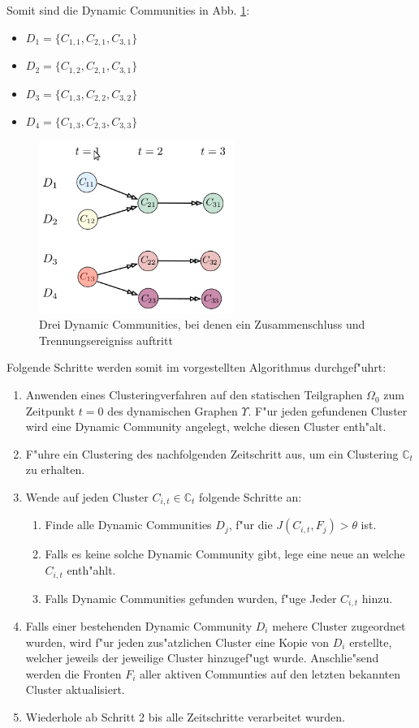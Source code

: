 \documentclass[journal]{vgtc}
\begin{document}
    Somit sind die Dynamic Communities in Abb. \ref{fig:dynamic2}:
    \begin{itemize}
      \item $D_1 =\{C_{1,1}, C_{2,1}, C_{3,1}\}$
      \item $D_2 =\{C_{1,2}, C_{2,1}, C_{3,1}\}$
      \item $D_3 =\{C_{1,3}, C_{2,2}, C_{3,2}\}$
      \item $D_4 =\{C_{1,3},C_{2,3}, C_{3,3}\}$
    \end{itemize}

    
    \begin{figure}[b]
      \centering
      \includegraphics[width=2.5in]{images/dynamic_communities2}
      \caption{\label{fig:dynamic2}  Drei Dynamic Communities, bei denen ein Zusammenschluss und Trennungsereigniss auftritt \cite{timestep}}
    \end{figure}
    Folgende Schritte werden somit im \cite{timestep} vorgestellten Algorithmus durchgef"uhrt:
    \begin{enumerate}
      \item Anwenden eines Clusteringverfahren auf den statischen Teilgraphen $\Omega_0$ zum Zeitpunkt $t=0$ des dynamischen Graphen $\Upsilon$. F"ur jeden gefundenen
	    Cluster wird eine Dynamic Community angelegt, welche diesen Cluster enth"alt.
      \item F"uhre ein Clustering des nachfolgenden Zeitschritt aus, um ein Clustering $\mathbb{C}_t$ zu erhalten.
      \item Wende auf jeden Cluster $C_{i,t} \in \mathbb{C}_t$ folgende Schritte an:
      \begin{enumerate}
	\item Finde alle Dynamic Communities $D_j$, f"ur die $J(C_{i,t},F_j) > \theta$ ist.
	\item Falls es keine solche Dynamic Community gibt, lege eine neue an welche $C_{i,t}$ enth"ahlt.
	\item Falls Dynamic Communities gefunden wurden, f"uge Jeder $C_{i,t}$ hinzu.
      \end{enumerate}
      \item Falls einer bestehenden Dynamic Community $D_i$ mehere Cluster zugeordnet wurden, wird f"ur jeden zus"atzlichen Cluster eine Kopie von $D_i$ erstellte,
	    welcher jeweils der jeweilige Cluster hinzugef"ugt wurde.
	    Anschlie"send werden die Fronten $F_i$ aller aktiven Communties auf den letzten bekannten Cluster aktualisiert.
      \item Wiederhole ab Schritt 2 bis alle Zeitschritte verarbeitet wurden.
    \end{enumerate}
\end{document}
